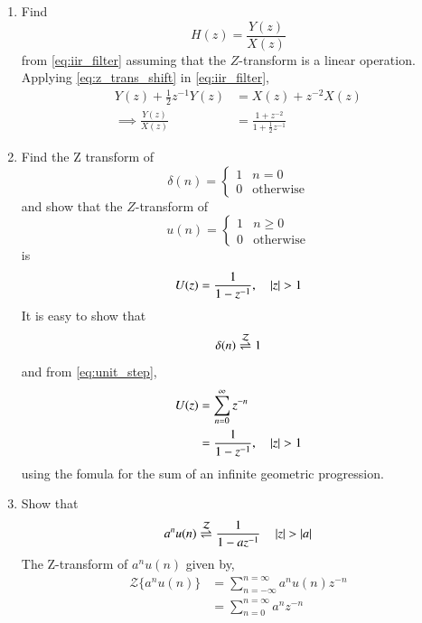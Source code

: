 \documentclass[journal,12pt,twocolumn]{IEEEtran}
\renewcommand\thesection{\arabic{section}}
\begin{document}
\begin{enumerate}[label=\thesection.\arabic*]
\item Find
%
\begin{equation}
	H(z) = \frac{Y(z)}{X(z)}
\end{equation}
%
from  \eqref{eq:iir_filter} assuming that the $Z$-transform is a linear operation.
\\
\solution  Applying \eqref{eq:z_trans_shift} in \eqref{eq:iir_filter},
\begin{align}
	Y(z) + \frac{1}{2}z^{-1}Y(z) &= X(z)+z^{-2}X(z)
	\\
	\implies \frac{Y(z)}{X(z)} &= \frac{1 + z^{-2}}{1 + \frac{1}{2}z^{-1}}
	\label{eq:freq_resp}
\end{align}
%
\item Find the Z transform of 
\begin{equation}
	\delta(n)
	=
	\begin{cases}
		1 & n = 0
		\\
		0 & \text{otherwise}
	\end{cases}
\end{equation}
and show that the $Z$-transform of
\begin{equation}
	\label{eq:unit_step}
	u(n)
	=
	\begin{cases}
		1 & n \ge 0
		\\
		0 & \text{otherwise}
	\end{cases}
\end{equation}
is
\begin{equation}
	U(z) = \frac{1}{1-z^{-1}}, \quad \left\vert z\right\vert > 1
\end{equation}
\solution It is easy to show that
\begin{equation}
	\delta(n) \overset{\mathcal{Z}}{ \rightleftharpoons} 1
\end{equation}
and from \eqref{eq:unit_step},
\begin{align}
	U(z) &= \sum _{n= 0}^{\infty}z^{-n}
	\\
	&=\frac{1}{1-z^{-1}}, \quad \left\vert z\right\vert > 1
\end{align}
using the fomula for the sum of an infinite geometric progression.
%
\item Show that 
\begin{equation}
	\label{eq:anun}
	a^nu(n) \overset{\mathcal{Z}}{ \rightleftharpoons} \frac{1}{1-az^{-1}} \quad \left\vert z\right\vert > \left\vert a\right\vert
\end{equation}
\solution
The Z-transform of $a^n u(n)$ given by,
\begin{align}
	{\mathcal {Z}}\{a^nu(n)\}&=\sum_{n=-\infty}^{n=\infty}a^nu(n)z^{-n}\\
	&=\sum_{n=0}^{n=\infty}a^nz^{-n}\\

\end{align}
\end{enumerate}
\end{document}
